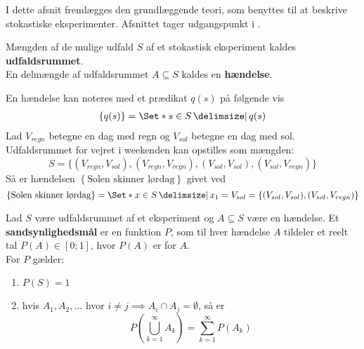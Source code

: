 I dette afsnit fremlægges den grundlæggende teori, som benyttes til at beskrive stokastiske eksperimenter. Afsnittet tager udgangspunkt i \cite{sandsynlighedsBog}.
\begin{defn}
Mængden af de mulige udfald $S$ af et stokastisk eksperiment kaldes \textbf{udfaldsrummet}.\\
En delmængde af udfaldsrummet $A\subseteq S$ kaldes en \textbf{hændelse}.
\end{defn}

En hændelse kan noteres med et prædikat $q(s)$ på følgende vis
\begin{align*}
    \left\{q(s)\right\} = \Set*{s\in S\given q(s)}
\end{align*}
Lad $V_{regn}$ betegne en dag med regn og $V_{sol}$ betegne en dag med sol. Udfaldsrummet for vejret i weekenden kan opstilles som mængden:
\begin{equation*}
    S = \{(V_{regn}, V_{sol}), (V_{regn}, V_{regn}), (V_{sol}, V_{sol}), (V_{sol}, V_{regn})\}
\end{equation*}
Så er hændelsen $\left\{\text{Solen skinner lørdag}\right\}$ givet ved
\begin{equation*}
    \left\{\text{Solen skinner lørdag}\right\} = \Set*{x \in S \given x_1 = V_{sol}} = \left\{(V_{sol}, V_{sol}), (V_{sol}, V_{regn})\right\}%
\end{equation*}

\begin{defn}  \label{def:axiomsOfPropability}
Lad $S$ være udfaldsrummet af et eksperiment og $A\subseteq S$ være en hændelse.
Et \textbf{sandsynlighedsmål} er en funktion $P$, som til hver hændelse $A$ tildeler et reelt tal $P(A) \in [0; 1]$, hvor $P(A)$ er  for $A$. \\ 
For $P$ gælder:
\begin{enumerate}
    \item $P(S)=1$
    \item hvis $A_1,A_2,\ldots$ hvor $i \neq j \implies A_i\cap A_j=\emptyset$, så er 
    \begin{equation*}
        P\left(\bigcup_{k=1}^\infty A_k\right)=\sum_{k=1}^\infty P(A_k)
    \end{equation*} \label{enu:axiomsOfPropability2}
\end{enumerate}
\end{defn}

